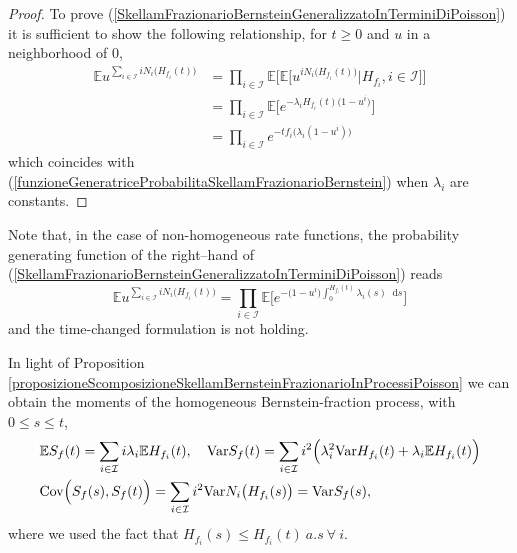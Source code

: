 \documentclass[12pt, twoside, english, headsepline]{article}
\newcommand*\dif{\mathop{}\!\mathrm{d}}  %
\theoremstyle{definition} %
\numberwithin{equation}{section} %
\begin{document}
\begin{proof}
To prove (\ref{SkellamFrazionarioBernsteinGeneralizzatoInTerminiDiPoisson}) it is sufficient to show the following relationship, for $t\ge0$ and $u$ in a neighborhood of $0$,
\begin{align*}
\mathbb{E}u^{\sum_{i\in\mathcal{I}} i N_i\big(H_{f_i}(t)\big)}& = \prod_{i\in\mathcal{I}}\mathbb{E}\Biggl[  \mathbb{E}\Big[u^{ i N_i\big(H_{f_i}(t)\big)}\Big| H_{f_i},i\in\mathcal{I}  \Big]\Bigg]\\
& = \prod_{i\in\mathcal{I}}\mathbb{E}\Biggl[  e^{-\lambda_i H_{f_i}(t)\big(1-u^i\big)}  \Bigg]\\
& = \prod_{i\in\mathcal{I}} e^{-tf_i\bigl(\lambda_i(1-u^i)\bigr)}
\end{align*}
which coincides with (\ref{funzioneGeneratriceProbabilitaSkellamFrazionarioBernstein}) when $\lambda_i$ are constants.
\end{proof}


Note that, in the case of non-homogeneous rate functions, the probability generating function of the right--hand of (\ref{SkellamFrazionarioBernsteinGeneralizzatoInTerminiDiPoisson}) reads
$$\mathbb{E}u^{\sum_{i\in\mathcal{I}} i N_i\big(H_{f_i}(t)\big)} =\prod_{i\in\mathcal{I}}\mathbb{E}\Biggl[  e^{-\big(1-u^i\big)\int_0^{H_{f_i}(t)}\lambda_i(s) \dif s}  \Bigg]$$
and the time-changed formulation is not holding.

In light of Proposition \ref{proposizioneScomposizioneSkellamBernsteinFrazionarioInProcessiPoisson} we can obtain the moments of the homogeneous Bernstein-fraction process, with $0\le s\le t$,
\begin{align}
&\mathbb{E}S_f(t) = \sum_{i\in\mathcal{I}} i\lambda_i \mathbb{E}H_{f_i}(t),\ \ \ \text{Var}S_f(t) = \sum_{i\in\mathcal{I}} i^2 \Big(\lambda_i^2 \text{Var}H_{f_i}(t) + \lambda_i \mathbb{E}H_{f_i}(t) \Bigr) \label{momentiSkellamBernsteinOmogeneo}\\
&\text{Cov}\Bigl(S_f(s), S_f(t)\Big)  =  \sum_{i\in\mathcal{I}} i^2 \text{Var}N_i\big(H_{f_i}(s)\big) =  \text{Var}S_f(s) ,  \nonumber
\end{align}
where we used the fact that $H_{f_i}(s)\le H_{f_i}(t)\ a.s\ \forall\ i$. 
\\
\end{document}
